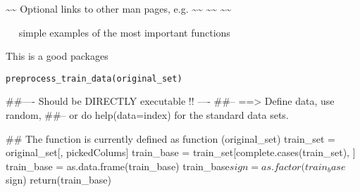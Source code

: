 \documentclass[a4paper]{book}
\begin{document}
%
\begin{SeeAlso}\relax
\textasciitilde{}\textasciitilde{} Optional links to other man pages, e.g. \textasciitilde{}\textasciitilde{}
\textasciitilde{}\textasciitilde{}  \textasciitilde{}\textasciitilde{}
\end{SeeAlso}
%
\begin{Examples}
\begin{ExampleCode}
~~ simple examples of the most important functions ~~
\end{ExampleCode}
\end{Examples}
%
\begin{Description}\relax

This is a good packages
\end{Description}
%
\begin{Usage}
\begin{verbatim}
preprocess_train_data(original_set)
\end{verbatim}
\end{Usage}
%
\begin{Arguments}
\begin{ldescription}
\item[\code{original\_set}] 


\end{ldescription}
\end{Arguments}
%
\begin{Examples}
\begin{ExampleCode}
##---- Should be DIRECTLY executable !! ----
##-- ==>  Define data, use random,
##--	or do  help(data=index)  for the standard data sets.

## The function is currently defined as
function (original_set) 
{
    train_set = original_set[, pickedColums]
    train_base = train_set[complete.cases(train_set), ]
    train_base = as.data.frame(train_base)
    train_base$sign = as.factor(train_base$sign)
    return(train_base)
  }
\end{ExampleCode}
\end{Examples}
\printindex{}
\end{document}
